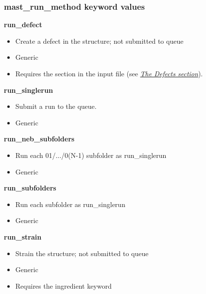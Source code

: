 \documentclass[letterpaper,10pt,english]{sphinxmanual}
\begin{document}
\subsubsection{mast\_run\_method keyword values}
\label{3_1_2_ingredients:mast-run-method-keyword-values}
\textbf{run\_defect}
\begin{itemize}
\item {} 
Create a defect in the structure; not submitted to queue

\item {} 
Generic

\item {} 
Requires the  section in the input file (see {\hyperref[3_1_5_defects::doc]{\emph{The Defects section}}}).

\end{itemize}

\textbf{run\_singlerun}
\begin{itemize}
\item {} 
Submit a run to the queue.

\item {} 
Generic

\end{itemize}

\textbf{run\_neb\_subfolders}
\begin{itemize}
\item {} 
Run each 01/.../0(N-1) subfolder as run\_singlerun

\item {} 
Generic

\end{itemize}

\textbf{run\_subfolders}
\begin{itemize}
\item {} 
Run each subfolder as run\_singlerun

\item {} 
Generic

\end{itemize}

\textbf{run\_strain}
\begin{itemize}
\item {} 
Strain the structure; not submitted to queue

\item {} 
Generic

\item {} 
Requires the  ingredient keyword

\end{itemize}
\end{document}
